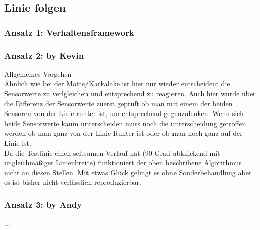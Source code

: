 \subsection{Linie folgen}

\subsubsection{Ansatz 1: Verhaltensframework}

\subsubsection{Ansatz 2: by Kevin}

Allgemeines Vorgehen\\
Ähnlich wie bei der Motte/Karkalake ist hier nur wieder entscheident die Sensorwerte zu verlgleichen und entsprechend zu reagieren. Auch hier wurde über die Differenz der Sensorwerte zuerst geprüft ob man mit einem der beiden Sensoren von der Linie runter ist, um entsprechend gegenzulenken. Wenn sich beide Sensorwerte kaum unterscheiden muss noch die unterscheidung getroffen werden ob man ganz von der Linie Runter ist oder ob man noch ganz auf der Linie ist.
\\
Da die Testlinie einen seltsamen Verlauf hat (90 Grad abknickend mit ungleichmäßiger Linienbreite) funktioniert der oben beschribene Algorithmus nicht an diesen Stellen. Mit etwas Glück gelingt es ohne Sonderbehandlung aber es ist bisher nicht verlässlich reproduzierbar.


\subsubsection{Ansatz 3: by Andy}
...
